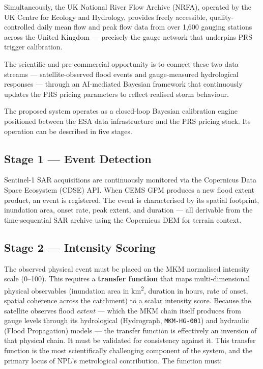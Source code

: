 \documentclass[11pt,a4paper]{article}
\begin{document}
Simultaneously, the UK National River Flow Archive (NRFA), operated by the UK
Centre for Ecology and Hydrology, provides freely accessible, quality-controlled
daily mean flow and peak flow data from over 1{,}600 gauging stations across the
United Kingdom --- precisely the gauge network that underpins PRS trigger
calibration.

The scientific and pre-commercial opportunity is to connect these two data
streams --- satellite-observed flood events and gauge-measured hydrological
responses --- through an AI-mediated Bayesian framework that continuously updates
the PRS pricing parameters to reflect realised storm behaviour.

\mkmframework

The proposed system operates as a closed-loop Bayesian calibration engine
positioned between the ESA data infrastructure and the PRS pricing stack. Its
operation can be described in five stages.

\subsection{Stage 1 --- Event Detection}

Sentinel-1 SAR acquisitions are continuously monitored via the Copernicus Data
Space Ecosystem (CDSE) API. When CEMS GFM produces a new flood extent product, an
event is registered. The event is characterised by its spatial footprint,
inundation area, onset rate, peak extent, and duration --- all derivable from the
time-sequential SAR archive using the Copernicus DEM for terrain context.

\subsection{Stage 2 --- Intensity Scoring}

The observed physical event must be placed on the MKM normalised intensity scale
(0--100). This requires a \textbf{transfer function} that maps multi-dimensional
physical observables (inundation area in km\textsuperscript{2}, duration in hours,
rate of onset, spatial coherence across the catchment) to a scalar intensity
score. Because the satellite observes flood \emph{extent} --- which the MKM chain
itself produces from gauge levels through its hydrological (Hydrograph,
\texttt{MKM-HG-001}) and hydraulic (Flood Propagation) models --- the transfer
function is effectively an inversion of that physical chain. It must be validated
for consistency against it. This transfer function is the most scientifically
challenging component of the system, and the primary locus of NPL's metrological
contribution. The function must:
\end{document}
